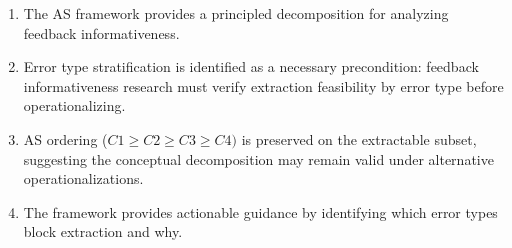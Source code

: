 \begin{enumerate}
\item The AS framework provides a principled decomposition for analyzing feedback informativeness.
\item Error type stratification is identified as a necessary precondition: feedback informativeness research must verify extraction feasibility by error type before operationalizing.
\item AS ordering ($C1\geq C2\geq C3\geq C4)$ is preserved on the extractable subset, suggesting the conceptual decomposition may remain valid under alternative operationalizations.
\item The framework provides actionable guidance by identifying which error types block extraction and why.
\end{enumerate}

